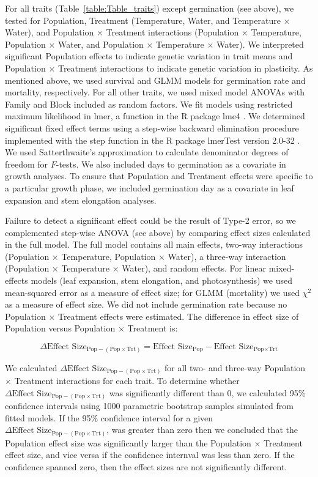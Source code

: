 \documentclass[11pt, oneside]{article}
\newcommand{\pkg}[1]{{\fontseries{b}\selectfont #1}}
\begin{document}
For all traits (Table~\ref{table:Table_traits}) except germination (see above), we tested for Population, Treatment (Temperature, Water, and Temperature $\times$ Water), and Population $\times$ Treatment interactions (Population $\times$ Temperature, Population $\times$ Water, and Population $\times$ Temperature $\times$ Water). We interpreted significant Population effects to indicate genetic variation in trait means and Population $\times$ Treatment interactions to indicate genetic variation in plasticity. As mentioned above, we used survival and GLMM models for germination rate and mortality, respectively. For all other traits, we used mixed model ANOVAs with Family and Block included as random factors. We fit models using restricted maximum likelihood in lmer, a function in the R package \pkg{lme4} \citep{Bates_etal_2015}. We determined significant fixed effect terms using a step-wise backward elimination procedure implemented with the step function in the R package \pkg{lmerTest} version 2.0-32 \citep{Kuznetsova_etal_2016}. We used Satterthwaite's approximation to calculate denominator degrees of freedom for $F$-tests. We also included days to germination as a covariate in growth analyses. To ensure that Population and Treatment effects were specific to a particular growth phase, we included germination day as a covariate in leaf expansion and stem elongation analyses.

Failure to detect a significant effect could be the result of Type-2 error, so we complemented step-wise ANOVA (see above) by comparing effect sizes calculated in the full model. The full model contains all main effects, two-way interactions (Population $\times$ Temperature, Population $\times$ Water), a three-way interaction (Population $\times$ Temperature $\times$ Water), and random effects. For linear mixed-effects models (leaf expansion, stem elongation, and photosynthesis) we used mean-squared error as a measure of effect size; for GLMM (mortality) we used $\chi^2$ as a measure of effect size. We did not include germination rate because no Population $\times$ Treatment effects were estimated. The difference in effect size of Population versus Population $\times$ Treatment is:

$$ \Delta \textrm{Effect Size}_{\textrm{Pop} - (\textrm{Pop} \times \textrm{Trt})} = \textrm{Effect Size}_\textrm{Pop} - \textrm{Effect Size}_{\textrm{Pop} \times \textrm{Trt}} $$

We calculated $\Delta \textrm{Effect Size}_{\textrm{Pop} - (\textrm{Pop} \times \textrm{Trt})}$ for all two- and three-way Population $\times$ Treatment interactions for each trait. To determine whether $\Delta \textrm{Effect Size}_{\textrm{Pop} - (\textrm{Pop} \times \textrm{Trt})}$ was significantly different than 0, we calculated 95\% confidence intervals using 1000 parametric bootstrap samples simulated from fitted models. If the 95\% confidence interval for a given $\Delta \textrm{Effect Size}_{\textrm{Pop} - (\textrm{Pop} \times \textrm{Trt})}$, was greater than zero then we concluded that the Population effect size was significantly larger than the Population $\times$ Treatment effect size, and vice versa if the confidence internval was less than zero. If the confidence spanned zero, then the effect sizes are not significantly different.
\end{document}
